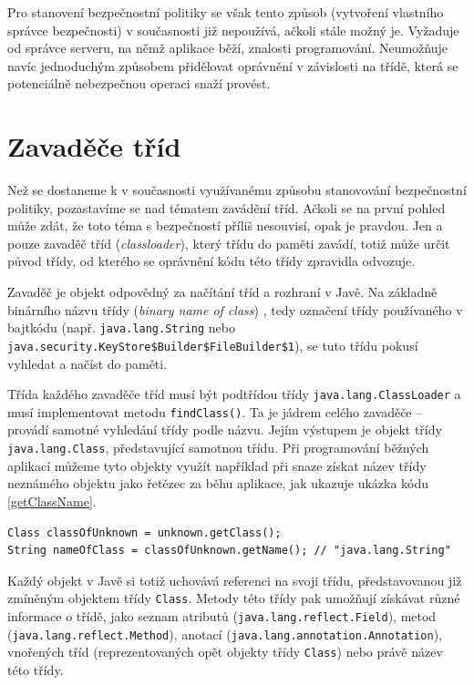 Pro stanovení bezpečnostní politiky se však tento způsob (vytvoření vlastního správce bezpečnosti) v současnosti již nepoužívá, ačkoli stále možný je.
Vyžaduje od správce serveru, na němž aplikace běží, znalosti programování. Neumožňuje navíc jednoduchým způsobem přidělovat oprávnění v závislosti na třídě,
která se potenciálně nebezpečnou operaci snaží provést.

\section{Zavaděče tříd} \label{classloader}

Než se dostaneme k v současnosti využívanému způsobu stanovování bezpečnostní politiky, pozastavíme se nad tématem zavádění tříd.
Ačkoli se na první pohled může zdát, že toto téma s bezpečností příliš nesouvisí, opak je pravdou.
Jen a pouze zavaděč tříd ({\it classloader}), který třídu do paměti zavádí, totiž může určit původ třídy, od kterého se oprávnění kódu této třídy zpravidla odvozuje.

Zavaděč je objekt odpovědný za načítání tříd a rozhraní v Javě. Na základně binárního názvu třídy ({\it binary name of class}) \cite{binaryNameOfClass}, tedy označení třídy používaného v bajtkódu (např. {\tt java.lang.String} nebo {\tt java.security.KeyStore\$Builder\$FileBuilder\$1}), se tuto třídu pokusí vyhledat a načíst do paměti. \cite{refClassLoader}

Třída každého zavaděče tříd musí být podtřídou třídy {\tt java.lang.ClassLoader} a musí implementovat metodu {\tt findClass()}. Ta je jádrem celého zavaděče -- provádí samotné vyhledání třídy podle názvu. Jejím výstupem je objekt třídy {\tt java.lang.Class}, představující samotnou třídu. Při programování běžných aplikací můžeme tyto objekty využít například při snaze získat název třídy neznámého objektu jako řetězec za běhu aplikace, jak ukazuje ukázka kódu \ref{getClassName}. \cite{refClassLoader}

\begin{lstlisting}[caption=Získávání názvu třídy neznámého objektu, label=getClassName]
Class classOfUnknown = unknown.getClass();
String nameOfClass = classOfUnknown.getName(); // "java.lang.String"
\end{lstlisting}

Každý objekt v Javě si totiž uchovává referenci na svoji třídu, představovanou již zmíněným objektem třídy {\tt Class}. Metody této třídy pak umožňují získávat různé informace o třídě, jako seznam atributů ({\tt java.lang.reflect.Field}), metod ({\tt java.lang.reflect.Method}), anotací ({\tt java.lang.annotation.Annotation}), vnořených tříd (reprezentovaných opět objekty třídy {\tt Class}) nebo právě název této třídy.


